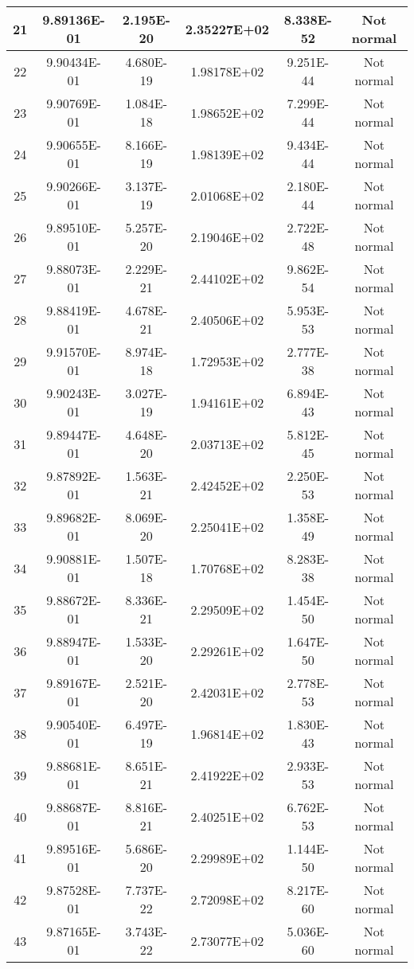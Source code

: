 \begin{table}[h]
\begin{tabular}{|c|c|c|c|c|c|}
		21 & 9.89136E-01 & 2.195E-20 & 2.35227E+02 & 8.338E-52 & Not normal\\\hline
		22 & 9.90434E-01 & 4.680E-19 & 1.98178E+02 & 9.251E-44 & Not normal\\\hline
		23 & 9.90769E-01 & 1.084E-18 & 1.98652E+02 & 7.299E-44 & Not normal\\\hline
		24 & 9.90655E-01 & 8.166E-19 & 1.98139E+02 & 9.434E-44 & Not normal\\\hline
		25 & 9.90266E-01 & 3.137E-19 & 2.01068E+02 & 2.180E-44 & Not normal\\\hline
		26 & 9.89510E-01 & 5.257E-20 & 2.19046E+02 & 2.722E-48 & Not normal\\\hline
		27 & 9.88073E-01 & 2.229E-21 & 2.44102E+02 & 9.862E-54 & Not normal\\\hline
		28 & 9.88419E-01 & 4.678E-21 & 2.40506E+02 & 5.953E-53 & Not normal\\\hline
		29 & 9.91570E-01 & 8.974E-18 & 1.72953E+02 & 2.777E-38 & Not normal\\\hline
		30 & 9.90243E-01 & 3.027E-19 & 1.94161E+02 & 6.894E-43 & Not normal\\\hline
		31 & 9.89447E-01 & 4.648E-20 & 2.03713E+02 & 5.812E-45 & Not normal\\\hline
		32 & 9.87892E-01 & 1.563E-21 & 2.42452E+02 & 2.250E-53 & Not normal\\\hline
		33 & 9.89682E-01 & 8.069E-20 & 2.25041E+02 & 1.358E-49 & Not normal\\\hline
		34 & 9.90881E-01 & 1.507E-18 & 1.70768E+02 & 8.283E-38 & Not normal\\\hline
		35 & 9.88672E-01 & 8.336E-21 & 2.29509E+02 & 1.454E-50 & Not normal\\\hline
		36 & 9.88947E-01 & 1.533E-20 & 2.29261E+02 & 1.647E-50 & Not normal\\\hline
		37 & 9.89167E-01 & 2.521E-20 & 2.42031E+02 & 2.778E-53 & Not normal\\\hline
		38 & 9.90540E-01 & 6.497E-19 & 1.96814E+02 & 1.830E-43 & Not normal\\\hline
		39 & 9.88681E-01 & 8.651E-21 & 2.41922E+02 & 2.933E-53 & Not normal\\\hline
		40 & 9.88687E-01 & 8.816E-21 & 2.40251E+02 & 6.762E-53 & Not normal\\\hline
		41 & 9.89516E-01 & 5.686E-20 & 2.29989E+02 & 1.144E-50 & Not normal\\\hline
		42 & 9.87528E-01 & 7.737E-22 & 2.72098E+02 & 8.217E-60 & Not normal\\\hline
		43 & 9.87165E-01 & 3.743E-22 & 2.73077E+02 & 5.036E-60 & Not normal\\\hline

\end{tabular}
\end{table}
